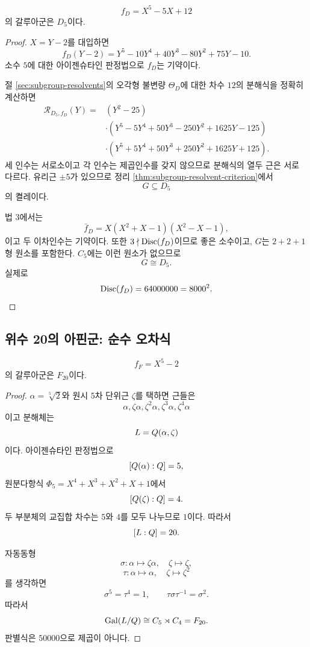 \begin{example}
\label{ex:quintic-d5}
\[
  f_D=X^5-5X+12
\]
의 갈루아군은 $D_5$이다.
\end{example}

\begin{proof}
$X=Y-2$를 대입하면
\[
  f_D(Y-2)
  =Y^5-10Y^4+40Y^3-80Y^2+75Y-10.
\]
소수 $5$에 대한 아이젠슈타인 판정법으로 $f_D$는 기약이다.

절 \ref{sec:subgroup-resolvents}의 오각형 불변량 $\Theta_D$에 대한 차수 $12$의 분해식을 정확히 계산하면
\[
\begin{aligned}
 \mathcal R_{D_5,f_D}(Y)
 ={}&(Y^2-25)\\
 &\cdot(Y^5-5Y^4+50Y^3-250Y^2+1625Y-125)\\
 &\cdot(Y^5+5Y^4+50Y^3+250Y^2+1625Y+125).
\end{aligned}
\]
세 인수는 서로소이고 각 인수는 제곱인수를 갖지 않으므로 분해식의 열두 근은 서로 다르다. 유리근 $\pm5$가 있으므로 정리 \ref{thm:subgroup-resolvent-criterion}에서
\[
  G\subseteq D_5
\]
의 켤레이다.

법 $3$에서는
\[
  \bar f_D
  =X(X^2+X-1)(X^2-X-1),
\]
이고 두 이차인수는 기약이다. 또한 $3\nmid\operatorname{Disc}(f_D)$이므로 좋은 소수이고, $G$는 $2+2+1$형 원소를 포함한다. $C_5$에는 이런 원소가 없으므로
\[
  G\cong D_5.
\]
실제로
\[
  \operatorname{Disc}(f_D)=64000000=8000^2.
\]
\end{proof}

\subsection{위수 20의 아핀군: 순수 오차식}

\begin{example}
\label{ex:quintic-f20}
\[
  f_F=X^5-2
\]
의 갈루아군은 $F_{20}$이다.
\end{example}

\begin{proof}
$\alpha=\sqrt[5]{2}$와 원시 $5$차 단위근 $\zeta$를 택하면 근들은
\[
  \alpha,\zeta\alpha,\zeta^2\alpha,
  \zeta^3\alpha,\zeta^4\alpha
\]
이고 분해체는
\[
  L=Q(\alpha,\zeta)
\]
이다. 아이젠슈타인 판정법으로
\[
  [Q(\alpha):Q]=5,
\]
원분다항식 $\Phi_5=X^4+X^3+X^2+X+1$에서
\[
  [Q(\zeta):Q]=4.
\]
두 부분체의 교집합 차수는 $5$와 $4$를 모두 나누므로 $1$이다. 따라서
\[
  [L:Q]=20.
\]

자동동형
\[
  \sigma:\alpha\mapsto\zeta\alpha,\quad\zeta\mapsto\zeta,
\]
\[
  \tau:\alpha\mapsto\alpha,\quad\zeta\mapsto\zeta^2
\]
를 생각하면
\[
  \sigma^5=\tau^4=1,
  \qquad
  \tau\sigma\tau^{-1}=\sigma^2.
\]
따라서
\[
  \operatorname{Gal}(L/Q)
  \cong C_5\rtimes C_4
  =F_{20}.
\]
판별식은 $50000$으로 제곱이 아니다.
\end{proof}

